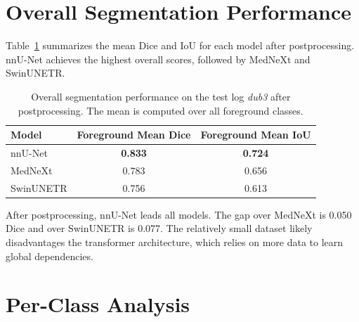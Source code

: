 
\section{Overall Segmentation Performance}

Table~\ref{tab:overall_results} summarizes the mean Dice and IoU for each model after postprocessing. nnU-Net achieves the highest overall scores, followed by MedNeXt and SwinUNETR.

\begin{table}[H]
    \centering
    \caption{Overall segmentation performance on the test log \textit{dub3} after postprocessing. The mean is computed over all foreground classes.}
    \label{tab:overall_results}
    \begin{tabular}{lcc}
        \toprule
        \textbf{Model} & \textbf{Foreground Mean Dice} & \textbf{Foreground Mean IoU} \\
        \midrule
        nnU-Net    & \textbf{0.833} & \textbf{0.724} \\
        MedNeXt    & 0.783          & 0.656          \\
        SwinUNETR  & 0.756          & 0.613          \\
        \bottomrule
    \end{tabular}
\end{table}

After postprocessing, nnU-Net leads all models. The gap over MedNeXt is 0.050 Dice and over SwinUNETR is 0.077. The relatively small dataset likely disadvantages the transformer architecture, which relies on more data to learn global dependencies.

\section{Per-Class Analysis}

